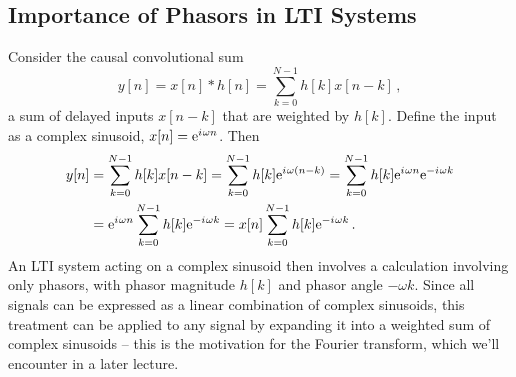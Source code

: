 \subsection{Importance of Phasors in LTI Systems}
%
Consider the causal convolutional sum
%
\begin{displaymath}
  y[n] = x[n] * h[n] = \sum_{k=0}^{N-1} h[k]x[n-k] \,, 
\end{displaymath}
%
a sum of delayed inputs $x[n-k]$ that are weighted by $h[k]$. Define
the input as a complex sinusoid, $x[n] = \mathrm{e}^{{i\mkern1mu}\omega n}$. Then
%
\begin{align*}
  y[n] &= \sum_{k=0}^{N-1} h[k]x[n-k] = \sum_{k=0}^{N-1} h[k]\mathrm{e}^{{i\mkern1mu}\omega(n-k)}
  = \sum_{k=0}^{N-1} h[k]\mathrm{e}^{{i\mkern1mu}\omega n}\mathrm{e}^{-{i\mkern1mu}\omega k} \\
  &= \mathrm{e}^{{i\mkern1mu}\omega n}\sum_{k=0}^{N-1}h[k]\mathrm{e}^{-{i\mkern1mu}\omega k}
  = x[n] \sum_{k=0}^{N-1}h[k]\mathrm{e}^{-{i\mkern1mu}\omega k} \,.
\end{align*}
%
An LTI system acting on a complex sinusoid then involves a calculation involving
only phasors, with phasor magnitude $h[k]$ and phasor angle $-\omega k$. Since
all signals can be expressed as a linear combination of
complex sinusoids, this treatment can be applied to any signal by expanding it
into a weighted sum of complex sinusoids -- this is the motivation for
the Fourier transform, which we'll encounter in a later lecture.
